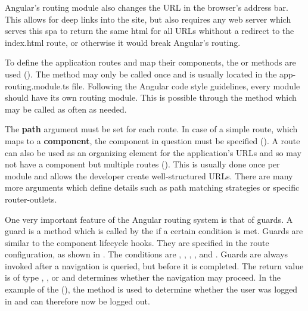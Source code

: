 Angular's routing module also changes the URL in the browser's address bar. This allows for deep links into the site, but also requires any web server which serves this \gls{spa} to return the same \gls{html} for all URLs whithout a redirect to the index.html route, or otherwise it would break Angular's routing.


To define the application routes and map their components, the  or  methods are used (). The  method may only be called once and is usually located in the app-routing.module.ts file. Following the Angular code style guidelines, every module should have its own routing module. This is possible through the  method which may be called as often as needed.

The \textbf{path} argument must be set for each route. In case of a simple route, which maps to a \textbf{component}, the component in question must be specified (). A route can also be used as an organizing element for the application's URLs and so may not have a component but multiple routes (). This is usually done once per module and allows the developer create well-structured URLs. There are many more arguments which define details such as path matching strategies or specific router-outlets.

One very important feature of the Angular routing system is that of guards. A guard is a method which is called by the  if a certain condition is met. Guards are similar to the component lifecycle hooks. They are specified in the route configuration, as shown in . The conditions are , , , , and . Guards are always invoked after a navigation is queried, but before it is completed. The return value is of type , , or  and determines whether the navigation may proceed. In the example of the  (), the  method is used to determine whether the user was logged in and can therefore now be logged out.

